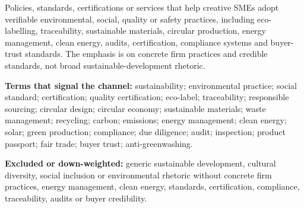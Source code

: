 Policies, standards, certifications or services that help creative SMEs adopt verifiable environmental, social, quality or safety practices, including eco-labelling, traceability, sustainable materials, circular production, energy management, clean energy, audits, certification, compliance systems and buyer-trust standards. The emphasis is on concrete firm practices and credible standards, not broad sustainable-development rhetoric.

\textbf{Terms that signal the channel:} sustainability; environmental practice; social standard; certification; quality certification; eco-label; traceability; responsible sourcing; circular design; circular economy; sustainable materials; waste management; recycling; carbon; emissions; energy management; clean energy; solar; green production; compliance; due diligence; audit; inspection; product passport; fair trade; buyer trust; anti-greenwashing.

\textbf{Excluded or down-weighted:} generic sustainable development, cultural diversity, social inclusion or environmental rhetoric without concrete firm practices, energy management, clean energy, standards, certification, compliance, traceability, audits or buyer credibility.

